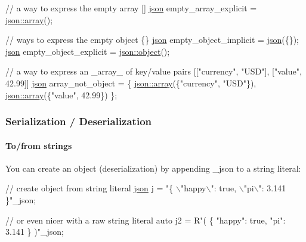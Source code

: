 \begin{DoxyCode}
\textcolor{comment}{// a way to express the empty array []}
\hyperlink{classnlohmann_1_1basic__json}{json} empty\_array\_explicit = \hyperlink{classnlohmann_1_1basic__json_aa80485befaffcadaa39965494e0b4d2e}{json::array}();

\textcolor{comment}{// ways to express the empty object \{\}}
\hyperlink{classnlohmann_1_1basic__json}{json} empty\_object\_implicit = \hyperlink{classnlohmann_1_1basic__json}{json}(\{\});
\hyperlink{classnlohmann_1_1basic__json}{json} empty\_object\_explicit = \hyperlink{classnlohmann_1_1basic__json_aa13f7c0615867542ce80337cbcf13ada}{json::object}();

\textcolor{comment}{// a way to express an \_array\_ of key/value pairs [["currency", "USD"], ["value", 42.99]]}
\hyperlink{classnlohmann_1_1basic__json}{json} array\_not\_object = \{ \hyperlink{classnlohmann_1_1basic__json_aa80485befaffcadaa39965494e0b4d2e}{json::array}(\{\textcolor{stringliteral}{"currency"}, \textcolor{stringliteral}{"USD"}\}), 
      \hyperlink{classnlohmann_1_1basic__json_aa80485befaffcadaa39965494e0b4d2e}{json::array}(\{\textcolor{stringliteral}{"value"}, 42.99\}) \};
\end{DoxyCode}


\subsubsection*{Serialization / Deserialization}

\paragraph*{To/from strings}

You can create an object (deserialization) by appending {\ttfamily \+\_\+json} to a string literal\+:


\begin{DoxyCode}
\textcolor{comment}{// create object from string literal}
\hyperlink{classnlohmann_1_1basic__json}{json} j = \textcolor{stringliteral}{"\{ \(\backslash\)"happy\(\backslash\)": true, \(\backslash\)"pi\(\backslash\)": 3.141 \}"}\_json;

\textcolor{comment}{// or even nicer with a raw string literal}
\textcolor{keyword}{auto} j2 = R\textcolor{stringliteral}{"(}
\textcolor{stringliteral}{  \{}
\textcolor{stringliteral}{    "happy": true,}
\textcolor{stringliteral}{    "pi": 3.141}
\textcolor{stringliteral}{  \}}
\textcolor{stringliteral}{)"\_json;}
\end{DoxyCode}


